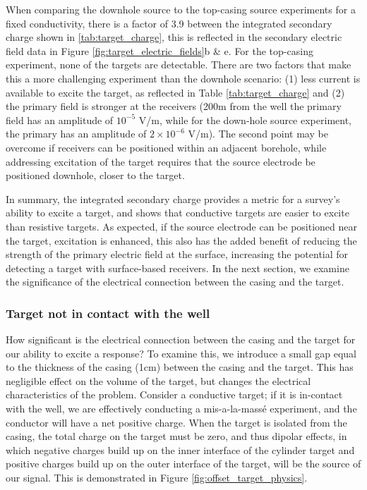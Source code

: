 When comparing the downhole source to the top-casing source experiments for a fixed conductivity, there is a factor of 3.9 between the integrated secondary charge shown in \ref{tab:target_charge}, this is reflected in the secondary electric field data in Figure \ref{fig:target_electric_fields}b \& e.  For the top-casing experiment, none of the targets are detectable. There are two factors that make this a more challenging experiment than the downhole scenario: (1) less current is available to excite the target, as reflected in Table \ref{tab:target_charge} and (2) the primary field is stronger at the receivers (200m from the well the primary field has an amplitude of $10^{-5}$ V/m, while for the down-hole source experiment, the primary has an amplitude of $2 \times 10^{-6}$ V/m). The second point may be overcome if receivers can be positioned within an adjacent borehole, while addressing excitation of the target requires that the source electrode be positioned downhole, closer to the target.

In summary, the integrated secondary charge provides a metric for a survey’s ability to excite a target, and shows that conductive targets are easier to excite than resistive targets. As expected, if the source electrode can be positioned near the target, excitation is enhanced, this also has the added benefit of reducing the strength of the primary electric field at the surface, increasing the potential for detecting a target with surface-based receivers. In the next section, we examine the significance of the electrical connection between the casing and the target.

\subsubsection{Target not in contact with the well}

How significant is the electrical connection between the casing and the target for our ability to excite a response? To examine this, we introduce a small gap equal to the thickness of the casing (1cm) between the casing and the target. This has negligible effect on the volume of the target, but changes the electrical characteristics of the problem. Consider a conductive target; if it is in-contact with the well, we are effectively conducting a mis-a-la-mass\'e experiment, and the conductor will have a net positive charge. When the target is isolated from the casing, the total charge on the target must be zero, and thus dipolar effects, in which negative charges build up on the inner interface of the cylinder target and positive charges build up on the outer interface of the target, will be the source of our signal. This is demonstrated in Figure \ref{fig:offset_target_physics}.

